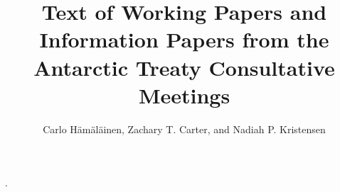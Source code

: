 \documentclass[12pt]{article}
\title{Text of Working Papers and Information Papers from the Antarctic Treaty Consultative Meetings}
\author{Carlo H{\"a}m{\"a}l{\"a}inen, Zachary T. Carter, and Nadiah P. Kristensen}
\begin{document}
\maketitle


%
  {}%
  {}%
  {}%
  {}%
  {\bfseries}%
  {.}%
  { }%
  {}%
\theoremstyle{mystyle}
%
\newtheorem{res2}{Result}[section]
\newenvironment{res}
  {\begin{shaded}\begin{res2}}
  {\end{res2}\end{shaded}}
%
\newtheorem{rmk2}{Remark}[section]
\newenvironment{rmk}
  {\begin{shaded}\begin{rmk2}}
  {\end{rmk2}\end{shaded}}

\theoremstyle{definition}
\newtheorem{examplex}{Example}
\newenvironment{exmi}
  {\pushQED{\qed}\renewcommand{\qedsymbol}{$\triangleleft$}\examplex}
  {\popQED\endexamplex}
\newenvironment{exm}
  {\begin{shaded}\begin{exmi}}
  {\end{exmi}\end{shaded}}
\end{document}
